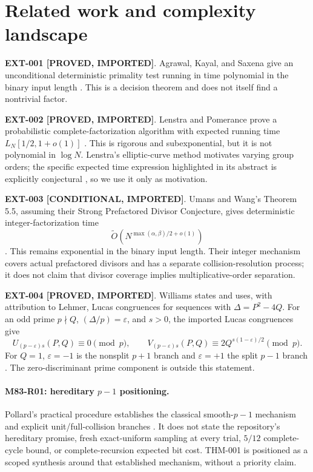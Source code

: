 \documentclass[11pt]{article}
\newcommand{\claimstatus}[2]{\textbf{#1 [#2]}}
\begin{document}
\section{Related work and complexity landscape}

\claimstatus{EXT-001}{PROVED, IMPORTED}. Agrawal, Kayal, and Saxena give an
unconditional deterministic primality test running in time polynomial in the
binary input length \cite{agrawal2004primes}. This is a decision theorem and
does not itself find a nontrivial factor.

\claimstatus{EXT-002}{PROVED, IMPORTED}. Lenstra and Pomerance prove a
probabilistic complete-factorization algorithm with expected running time
\(L_N[1/2,1+o(1)]\) \cite{lenstra1992rigorous}. This is rigorous and
subexponential, but it is not polynomial in \(\log N\). Lenstra's
elliptic-curve method motivates varying group orders; the specific expected
time expression highlighted in its abstract is explicitly conjectural
\cite{lenstra1987elliptic}, so we use it only as motivation.

\claimstatus{EXT-003}{CONDITIONAL, IMPORTED}. Umans and Wang's Theorem 5.5,
assuming their Strong Prefactored Divisor Conjecture, gives deterministic
integer-factorization time
\[
\widetilde O\!\left(N^{\max(\alpha,\beta)/2+o(1)}\right)
\]
\cite{umans2025numbertheoretic}. This remains exponential in the binary input
length. Their integer mechanism covers actual prefactored divisors and has a
separate collision-resolution process; it does not claim that divisor
coverage implies multiplicative-order separation.

\claimstatus{EXT-004}{PROVED, IMPORTED}. Williams states and uses, with
attribution to Lehmer, Lucas congruences for sequences with
\(\Delta=P^2-4Q\). For an odd prime \(p\nmid Q\),
\((\Delta/p)=\varepsilon\), and \(s>0\), the imported Lucas congruences give
\[
U_{(p-\varepsilon)s}(P,Q)\equiv0\pmod p,\qquad
V_{(p-\varepsilon)s}(P,Q)
\equiv2Q^{s(1-\varepsilon)/2}\pmod p.
\]
For \(Q=1\), \(\varepsilon=-1\) is the nonsplit \(p+1\) branch and
\(\varepsilon=+1\) the split \(p-1\) branch
\cite{williams1982pplusone}. The zero-discriminant prime component is outside
this statement.

\paragraph{M83-R01: hereditary \(p-1\) positioning.}
Pollard's practical procedure establishes the classical smooth-\(p-1\)
mechanism and explicit unit/full-collision branches
\cite{pollard1974theorems}. It does not state the repository's hereditary
promise, fresh exact-uniform sampling at every trial, \(5/12\) complete-cycle
bound, or complete-recursion expected bit cost. THM-001 is positioned as a
scoped synthesis around that established mechanism, without a priority
claim.
\end{document}
